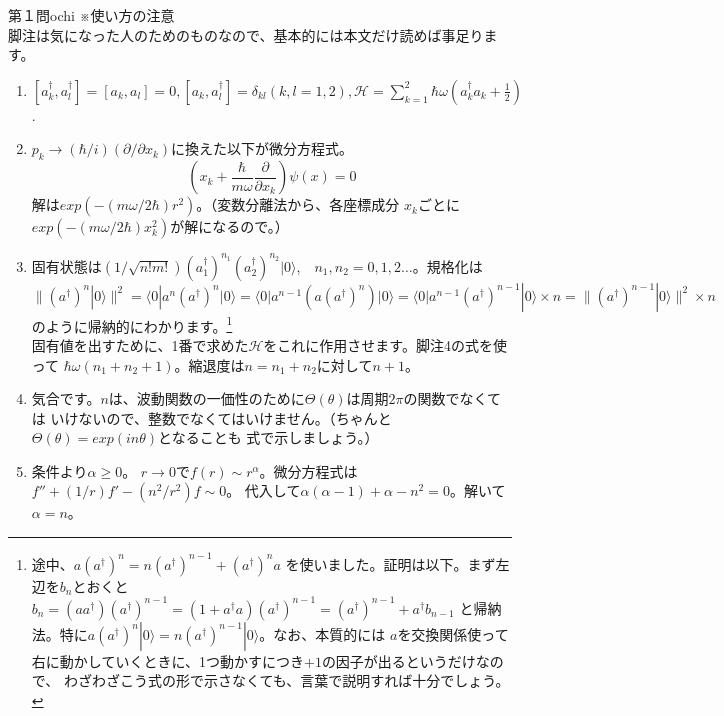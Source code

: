 \begin{answer}{第１問}{ochi}
※使い方の注意\\
脚注は気になった人のためのものなので、基本的には本文だけ読めば事足ります。
\begin{enumerate}
\item
  $[ a_k^\dag, a_l^\dag ]=[a_k, a_l]=0, [a_k, a_l^\dag]=\delta_{kl}　(k,l=1,2),　
  \mathcal{H}=\sum_{k=1}^2 \hbar \omega(a_k^\dag a_k+\frac{1}{2})$.

\item
  $p_k\to(\hbar/i)(\partial/\partial x_k)$に換えた以下が微分方程式。
  \begin{equation}
    (x_k+\frac{\hbar}{m\omega}\frac{\partial}{\partial x_k} )\psi (x)=0
  \end{equation}
  解は$exp(-(m\omega/2\hbar)r^2)$。（変数分離法から、各座標成分
  $x_k$ごとに$exp(-(m\omega/2\hbar)x_k^2)$が解になるので。）

\item
  固有状態は$(1/\sqrt{n!m!})(a_1^\dag )^{n_1}(a_2^\dag)^{n_2}
  | 0\rangle$,　$n_1,n_2=0,1,2\dots$。規格化は$\| (a^\dag)^n |0 \rangle\|^2
  =\langle 0|a^n(a^\dag)^n |0\rangle=\langle 0|a^{n-1}(a(a^\dag)^n)|0\rangle
  =\langle 0|a^{n-1}(a^\dag)^{n-1}|0\rangle \times n
  =\| (a^\dag)^{n-1} |0\rangle \|^2 \times n$
  のように帰納的にわかります。\footnote{途中、$a(a^\dag)^n=n(a^\dag)^{n-1}+(a^\dag)^na$
  を使いました。証明は以下。まず左辺を$b_n$とおくと
  $b_n=(aa^\dag)(a^\dag)^{n-1}=(1+a^\dag a)(a^\dag)^{n-1}=(a^\dag)^{n-1}+a^\dag b_{n-1}$
  と帰納法。特に$a(a^\dag)^n|0\rangle=n(a^\dag)^{n-1}|0\rangle$。なお、本質的には
  $a$を交換関係使って右に動かしていくときに、1つ動かすにつき$+1$の因子が出るというだけなので、
  わざわざこう式の形で示さなくても、言葉で説明すれば十分でしょう。}\\

  固有値を出すために、1番で求めた$\mathcal{H}$をこれに作用させます。脚注4の式を使って
  $\hbar \omega (n_1+n_2+1)$。縮退度は$n=n_1+n_2$に対して$n+1$。

\item
  気合です。$n$は、波動関数の一価性のために$\Theta(\theta)$は周期$2\pi$の関数でなくては
  いけないので、整数でなくてはいけません。（ちゃんと$\Theta(\theta)=exp(in\theta)$となることも
  式で示しましょう。）

\item
  条件より$\alpha\geq 0$。
  $r\to 0$で$f(r)\sim r^{\alpha}$。微分方程式は$f''+(1/r)f'-(n^2/r^2)f\sim 0$。
  代入して$\alpha(\alpha -1)+\alpha -n^2=0$。解いて$\alpha=n$。


\end{enumerate}
\end{answer}
